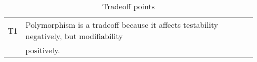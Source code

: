 \begin{table}[h]
  \begin{tabularx}{360pt}{|l|X|}
\hline
T1 & Polymorphism is a tradeoff because it affects testability negatively, but modifiability 
\\ & positively.\\
\hline
\end{tabularx}
\caption{Tradeoff points}
\label{tradeoff}
\end{table}
